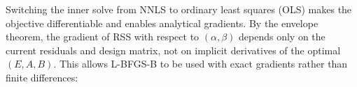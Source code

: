 \documentclass[11pt]{article}
\begin{document}
\begin{figure}[H]
\centering
{}
\end{figure}

Switching the inner solve from NNLS to ordinary least squares (OLS) makes the
objective differentiable and enables analytical gradients. By the envelope
theorem, the gradient of RSS with respect to $(\alpha, \beta)$ depends only on
the current residuals and design matrix, not on implicit derivatives of the
optimal $(E, A, B)$. This allows L-BFGS-B to be used with exact gradients
rather than finite differences:
\end{document}
